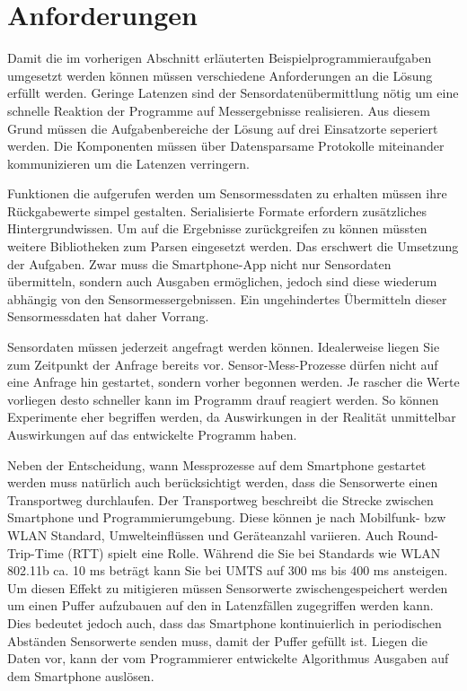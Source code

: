 \documentclass[11pt,a4paper]{report}
\begin{document}
\section{Anforderungen}\label{sec:anforderungen}
Damit die im vorherigen Abschnitt erläuterten Beispielprogrammieraufgaben umgesetzt werden können müssen verschiedene Anforderungen an die Lösung erfüllt werden.
Geringe Latenzen sind der Sensordatenübermittlung nötig um eine schnelle Reaktion der Programme auf Messergebnisse realisieren.
Aus diesem Grund müssen die Aufgabenbereiche der Lösung auf drei Einsatzorte seperiert werden.
Die Komponenten müssen über Datensparsame Protokolle miteinander kommunizieren um die Latenzen verringern.

Funktionen die aufgerufen werden um Sensormessdaten zu erhalten müssen ihre Rückgabewerte simpel gestalten.
Serialisierte Formate erfordern zusätzliches Hintergrundwissen.
Um auf die Ergebnisse zurückgreifen zu können müssten weitere Bibliotheken zum Parsen eingesetzt werden.
Das erschwert die Umsetzung der Aufgaben.
Zwar muss die Smartphone-App nicht nur Sensordaten übermitteln, sondern auch Ausgaben ermöglichen, jedoch sind diese wiederum abhängig von den Sensormessergebnissen.
Ein ungehindertes Übermitteln dieser Sensormessdaten hat daher Vorrang.

Sensordaten müssen jederzeit angefragt werden können.
Idealerweise liegen Sie zum Zeitpunkt der Anfrage bereits vor.
Sensor-Mess-Prozesse dürfen nicht auf eine Anfrage hin gestartet, sondern vorher begonnen werden.
Je rascher die Werte vorliegen desto schneller kann im Programm drauf reagiert werden.
So können Experimente eher begriffen werden, da Auswirkungen in der Realität unmittelbar Auswirkungen auf das entwickelte Programm haben.

Neben der Entscheidung, wann Messprozesse auf dem Smartphone gestartet werden muss natürlich auch berücksichtigt werden, dass die Sensorwerte einen Transportweg durchlaufen.
Der Transportweg beschreibt die Strecke zwischen Smartphone und Programmierumgebung.
Diese können je nach Mobilfunk- bzw WLAN Standard, Umwelteinflüssen und Geräteanzahl variieren.
Auch Round-Trip-Time (RTT) spielt eine Rolle.
Während die Sie bei Standards wie WLAN 802.11b ca. 10 ms beträgt kann Sie bei UMTS auf 300 ms bis 400 ms ansteigen.\cite{network_latencies}
Um diesen Effekt zu mitigieren müssen Sensorwerte zwischengespeichert werden um einen Puffer aufzubauen auf den in Latenzfällen zugegriffen werden kann.
Dies bedeutet jedoch auch, dass das Smartphone kontinuierlich in periodischen Abständen Sensorwerte senden muss, damit der Puffer gefüllt ist.
Liegen die Daten vor, kann der vom Programmierer entwickelte Algorithmus Ausgaben auf dem Smartphone auslösen.
\end{document}
